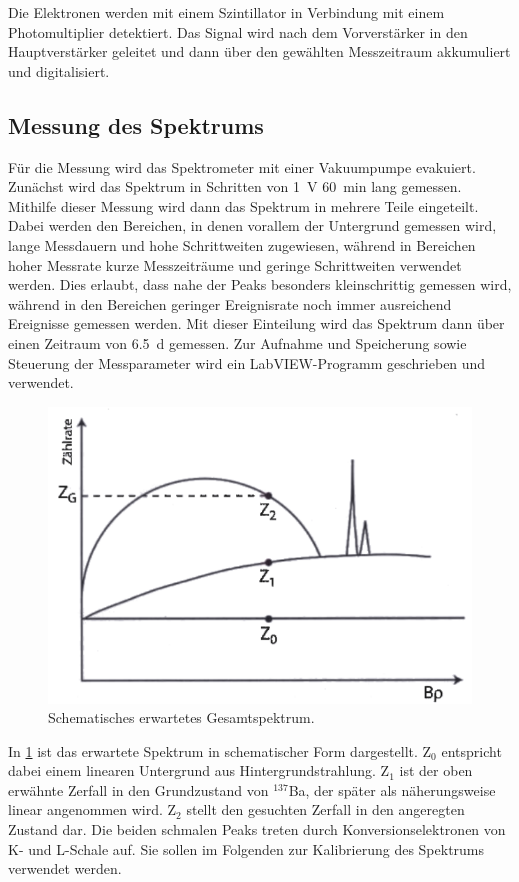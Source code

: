 \documentclass[
	a4paper,
	12pt,
	pagesize,
	ngerman
]{scrartcl}
\begin{document}
	Die Elektronen werden mit einem Szintillator in Verbindung mit einem Photomultiplier detektiert.
	Das Signal wird nach dem Vorverstärker in den Hauptverstärker geleitet und dann über den gewählten Messzeitraum akkumuliert und digitalisiert.

	\subsection{Messung des Spektrums}

	Für die Messung wird das Spektrometer mit einer Vakuumpumpe evakuiert.
	Zunächst wird das Spektrum in Schritten von \SI{1}{V} \SI{60}{\minute} lang gemessen.
	Mithilfe dieser Messung wird dann das Spektrum in mehrere Teile eingeteilt.
	Dabei werden den Bereichen, in denen vorallem der Untergrund gemessen wird, lange Messdauern und hohe Schrittweiten zugewiesen, während in Bereichen hoher Messrate kurze Messzeiträume und geringe Schrittweiten verwendet werden.
	Dies erlaubt, dass nahe der Peaks besonders kleinschrittig gemessen wird, während in den Bereichen geringer Ereignisrate noch immer ausreichend Ereignisse gemessen werden.
	Mit dieser Einteilung wird das Spektrum dann über einen Zeitraum von \SI{6,5}{\day} gemessen.
	Zur Aufnahme und Speicherung sowie Steuerung der Messparameter wird ein LabVIEW-Programm geschrieben und verwendet.

	\begin{figure}[H]
			\includegraphics[width= 0.6 \linewidth]{img/Schema_Spektrum}
			\caption{
			Schematisches erwartetes Gesamtspektrum.
			\cite{Anleitung}
			}
			\label{fig_Schema_Spektrum}
	\end{figure}

	In \cref{fig_Schema_Spektrum} ist das erwartete Spektrum in schematischer Form dargestellt.
	Z$_0$ entspricht dabei einem linearen Untergrund aus Hintergrundstrahlung.
	Z$_1$ ist der oben erwähnte Zerfall in den Grundzustand von $^{137}$Ba, der später als näherungsweise linear angenommen wird.
	Z$_2$ stellt den gesuchten Zerfall in den angeregten Zustand dar.
	Die beiden schmalen Peaks treten durch Konversionselektronen von K- und L-Schale auf.
	Sie sollen im Folgenden zur Kalibrierung des Spektrums verwendet werden.
\end{document}
